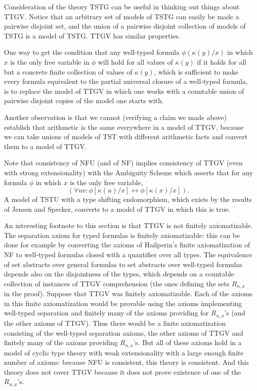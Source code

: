 \documentclass[12pt]{article}
\begin{document}
Consideration of the theory TSTG can be useful in thinking out things about TTGV.  Notice that
an arbitrary set of models of TSTG can easily be made a pairwise disjoint set, and the union of a pairwise disjoint collection of models of TSTG is a model of TSTG.  TTGV has similar properties.

One way to get the condition that any well-typed formula $\phi(\kappa(y)/x)$ in which $x$ is the only free variable in $\phi$
will hold for all values of $\kappa(y)$ if it holds for all but a concrete finite collection of values of $\kappa(y)$, which is sufficient to make every formula equivalent to the partial universal closure of a well-typed formula, is to replace the model of TTGV in which one works with a countable union of pairwise disjoint copies of the model one starts with.

Another observation is that we cannot (verifying a claim we made above) establish that arithmetic is the same everywhere in a model of TTGV, because we can take unions of models of TST with different arithmetic facts and convert them to a model of TTGV.

Note that consistency of NFU (and of NF) implies consistency of TTGV (even with strong extensionality) with the Ambiguity Scheme which asserts that for any  formula $\phi$ in which $x$ is the only free variable, $$(\forall uv:\phi[\kappa(u)/x]\leftrightarrow \phi[\kappa(x)/x]).$$  A model of TSTU with a type shifting endomorphism, which exists by the results of Jensen and Specker, converts to a model of TTGV in which this is true.

An interesting footnote to this section is that TTGV is not finitely axiomatizable.  The separation axiom for typed formulas is finitely axiomatizable:  this can be done for example by converting the axioms of Hailperin's finite axiomatization of NF to well-typed formulas closed with a quantifier over all types.  The equivalence of set abstracts over general formulas to set abstracts over well-typed formulas depends also on the disjointness of the types, which depends on a countable collection
of instances of TTGV comprehension (the ones defining the sets $R_{n,x}$ in the proof).  Suppose that TTGV was finitely axiomatizable.  Each of the axioms in this finite axiomatization would be provable using the axioms implementing well-typed separation and finitely many of the axioms providing for $R_{n,x}$'s (and the other axioms of TTGV).  Thus there would be a finite axiomatization consisting of the well-typed separation axioms, the other axioms of TTGV and finitely many of the axioms providing $R_{n,x}$'s.  But all of these axioms hold in a model of cyclic type theory with weak extensionality with a large enough finite number of axioms:  because NFU is consistent, this theory is consistent.  And this theory does not cover TTGV because it does not prove existence of one of the $R_{n,x}$'s.
\end{document}
